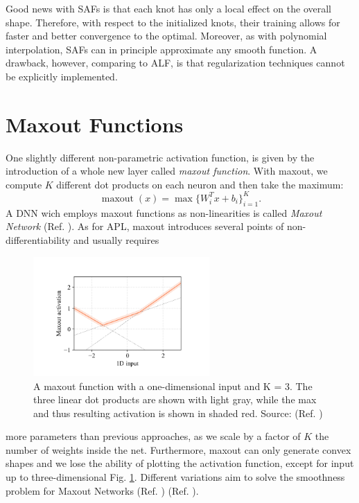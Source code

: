 \documentclass[LaM,binding=0.6cm]{./packages/sapthesis/sapthesis}
\begin{document}
    Good news with SAFs is that each knot has only a local effect on the overall shape. Therefore, with respect to the initialized knots, their training allows for faster and better convergence
    to the optimal. Moreover, as with polynomial interpolation, SAFs can in principle approximate any smooth function. A drawback, however, 
    comparing to ALF, is that regularization techniques cannot be explicitly implemented.
    \section{Maxout Functions}
    One slightly different non-parametric activation function, is given by the introduction of a whole new layer called \textit{maxout function}. With maxout, we compute $K$ different dot products
    on each neuron and then take the maximum:
    \begin{equation}
        \operatorname{maxout}(x) = \max \{  W_i^Tx + b_i \}_{i=1}^K .
    \end{equation}
    A DNN wich employs maxout functions as non-linearities is called \textit{Maxout Network} (Ref. ). As for APL, maxout introduces several points of non-differentiability and usually requires 
    \begin{figure}[!h]
        \centering
        \includegraphics[width=0.6\textwidth]{maxout}
        \caption{A maxout function with a one-dimensional input and K = 3. The
        three linear dot products are shown with light gray, while the max and thus resulting activation is shown
        in shaded red. Source: (Ref. )}
        \label{fig:maxout}
    \end{figure}
    more parameters than previous approaches, as we scale by a factor of $K$ the number of weights inside the net. Furthermore, maxout can only generate convex shapes and 
    we lose the ability of plotting the activation function, except for input up to three-dimensional Fig. \ref{fig:maxout}.
    Different variations aim to solve the smoothness problem for Maxout Networks (Ref. ) (Ref. ). 
\end{document}
